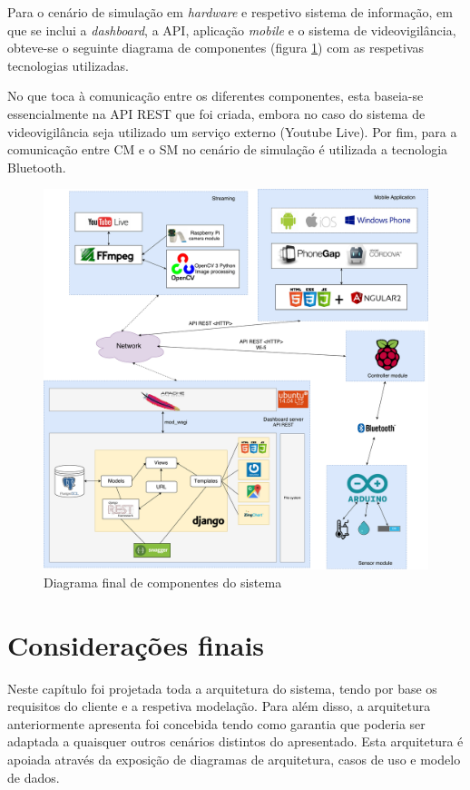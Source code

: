 Para o cenário de simulação em \textit{hardware} e respetivo sistema de informação, em que se inclui a \textit{dashboard}, a \ac{API}, aplicação \textit{mobile} e o sistema de videovigilância, obteve-se o seguinte diagrama de componentes (figura \ref{componentesall}) com as respetivas tecnologias utilizadas. 

No que toca à comunicação entre os diferentes componentes, esta baseia-se essencialmente na API REST que foi criada, embora no caso do sistema de videovigilância seja utilizado um serviço externo (Youtube Live). Por fim, para a comunicação entre \acl{CM} e o \acl{SM} no cenário de simulação é utilizada a tecnologia Bluetooth. 



\newpage

\begin{figure}[!htb]
	\centering
	\includegraphics[width=\linewidth]{esquemas/arquitetura-final.pdf}
	\caption{Diagrama final de componentes do sistema}
	\label{componentesall}
\end{figure}







\section{Considerações finais}


Neste capítulo foi projetada toda a arquitetura do sistema, tendo por base os requisitos do cliente e a respetiva modelação. Para além disso, a arquitetura anteriormente apresenta foi concebida tendo como garantia que poderia ser adaptada a quaisquer outros cenários distintos do apresentado. Esta arquitetura é apoiada através da exposição de diagramas de arquitetura, casos de uso e modelo de dados. 







